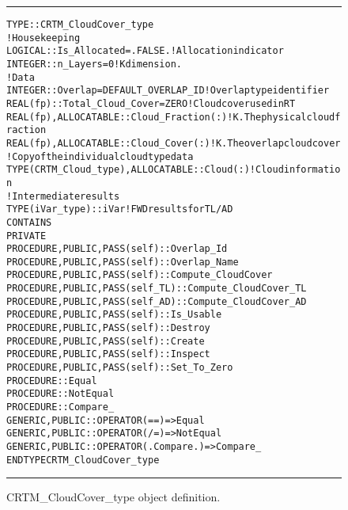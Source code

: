 \begin{figure}[htp]
  \caption{CRTM\_CloudCover\_type object definition.}
  \label{fig:CRTM_CloudCover_object}
  \noindent\rule[0.5ex]{\linewidth}{1pt}
  \centering
  \begin{alltt}
  TYPE :: CRTM_CloudCover_type
    ! Housekeeping
    LOGICAL :: Is_Allocated = .FALSE.                   ! Allocation indicator
    INTEGER :: n_Layers = 0                             ! K dimension.
    ! Data
    INTEGER  :: Overlap           = DEFAULT_OVERLAP_ID  ! Overlap type identifier
    REAL(fp) :: Total_Cloud_Cover = ZERO                ! Cloud cover used in RT
    REAL(fp), ALLOCATABLE :: Cloud_Fraction(:)          ! K. The physical cloud fraction
    REAL(fp), ALLOCATABLE :: Cloud_Cover(:)             ! K. The overlap cloud cover
    ! Copy of the individual cloud type data
    TYPE(CRTM_Cloud_type), ALLOCATABLE :: Cloud(:)      ! Cloud information
    ! Intermediate results
    TYPE(iVar_type) :: iVar                             ! FWD results for TL/AD
  CONTAINS
    PRIVATE
    PROCEDURE, PUBLIC, PASS(self)    :: Overlap_Id
    PROCEDURE, PUBLIC, PASS(self)    :: Overlap_Name
    PROCEDURE, PUBLIC, PASS(self)    :: Compute_CloudCover
    PROCEDURE, PUBLIC, PASS(self_TL) :: Compute_CloudCover_TL
    PROCEDURE, PUBLIC, PASS(self_AD) :: Compute_CloudCover_AD
    PROCEDURE, PUBLIC, PASS(self)    :: Is_Usable
    PROCEDURE, PUBLIC, PASS(self)    :: Destroy
    PROCEDURE, PUBLIC, PASS(self)    :: Create
    PROCEDURE, PUBLIC, PASS(self)    :: Inspect
    PROCEDURE, PUBLIC, PASS(self)    :: Set_To_Zero
    PROCEDURE :: Equal
    PROCEDURE :: NotEqual
    PROCEDURE :: Compare_
    GENERIC, PUBLIC :: OPERATOR(==) => Equal
    GENERIC, PUBLIC :: OPERATOR(/=) => NotEqual
    GENERIC, PUBLIC :: OPERATOR(.Compare.) => Compare_
  END TYPE CRTM_CloudCover_type
  \end{alltt}
  \noindent\rule[0.5ex]{\linewidth}{1pt}
\end{figure}
